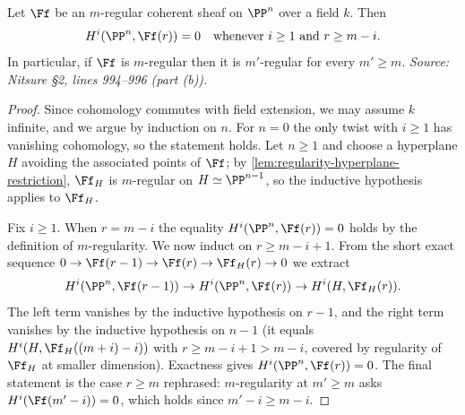 \begin{lemma}
  \label{lem:castelnuovo-vanishing}
  Let $\Ff$ be an $m$-regular coherent sheaf on $\PP^n$ over a field $k$. Then
  \[
    H^i(\PP^n,\Ff(r)) = 0 \quad\text{whenever } i\ge1 \text{ and } r\ge m-i .
  \]
  In particular, if $\Ff$ is $m$-regular then it is $m'$-regular for every
  $m'\ge m$.
  \textit{Source: Nitsure \S2, lines 994--996 (part (b)).}
\end{lemma}

\begin{proof}
  Since cohomology commutes with field extension, we may assume $k$ infinite,
  and we argue by induction on $n$. For $n=0$ the only twist with $i\ge1$ has
  vanishing cohomology, so the statement holds. Let $n\ge1$ and choose a
  hyperplane $H$ avoiding the associated points of $\Ff$; by
  \cref{lem:regularity-hyperplane-restriction}, $\Ff_H$ is $m$-regular on
  $H\simeq\PP^{n-1}$, so the inductive hypothesis applies to $\Ff_H$.

  Fix $i\ge1$. When $r=m-i$ the equality $H^i(\PP^n,\Ff(r))=0$ holds by the
  definition of $m$-regularity. We now induct on $r\ge m-i+1$. From the short
  exact sequence
  $0\to\Ff(r-1)\to\Ff(r)\to\Ff_H(r)\to0$ we extract
  \[
    H^i(\PP^n,\Ff(r-1)) \to H^i(\PP^n,\Ff(r)) \to H^i(H,\Ff_H(r)) .
  \]
  The left term vanishes by the inductive hypothesis on $r-1$, and the right
  term vanishes by the inductive hypothesis on $n-1$ (it equals
  $H^i(H,\Ff_H((m+i)-i))$ with $r\ge m-i+1>m-i$, covered by regularity of
  $\Ff_H$ at smaller dimension). Exactness gives $H^i(\PP^n,\Ff(r))=0$. The
  final statement is the case $r\ge m$ rephrased: $m$-regularity at $m'\ge m$
  asks $H^i(\Ff(m'-i))=0$, which holds since $m'-i\ge m-i$.
\end{proof}


